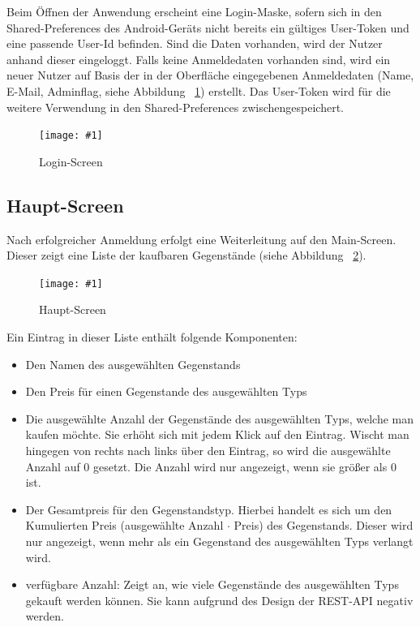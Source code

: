 \documentclass{scrartcl}
\newcommand{\cfigure}[3]{%
\begin{figure}[ht]
	\centering
	\texttt{[image: \#1]}
	\caption{#2}{#3} %
\end{figure}
}
\begin{document}
	Beim Öffnen der Anwendung erscheint eine Login-Maske, sofern sich in den Shared-Preferences des Android-Geräts nicht bereits ein gültiges User-Token und eine passende User-Id befinden.
	Sind die Daten vorhanden, wird der Nutzer anhand dieser eingeloggt.
	Falls keine Anmeldedaten vorhanden sind, wird ein neuer Nutzer auf Basis der in der Oberfläche eingegebenen Anmeldedaten (Name, E-Mail, Adminflag, siehe Abbildung ~\ref{loginscreen}) erstellt.
	Das User-Token wird für die weitere Verwendung in den Shared-Preferences zwischengespeichert.

	\cfigure{figures/placeholder.png}{Login-Screen}{\label{loginscreen}}

	\subsection{Haupt-Screen}\label{subsec:haupt-screen}

	Nach erfolgreicher Anmeldung erfolgt eine Weiterleitung auf den Main-Screen.
	Dieser zeigt eine Liste der kaufbaren Gegenstände (siehe Abbildung ~\ref{mainscreen}).

	\cfigure{figures/placeholder.png}{Haupt-Screen}{\label{mainscreen}}

	Ein Eintrag in dieser Liste enthält folgende Komponenten:

	\begin{itemize}
		\item Den Namen des ausgewählten Gegenstands

		\item Den Preis für einen Gegenstande des ausgewählten Typs

		\item Die ausgewählte Anzahl der Gegenstände des ausgewählten Typs, welche man kaufen möchte.
		Sie erhöht sich mit jedem Klick auf den Eintrag.
		Wischt man hingegen von rechts nach links über den Eintrag, so wird die ausgewählte Anzahl auf 0 gesetzt.
		Die Anzahl wird nur angezeigt, wenn sie größer als 0 ist.

		\item Der Gesamtpreis für den Gegenstandstyp.
		Hierbei handelt es sich um den Kumulierten Preis (ausgewählte Anzahl $\cdot$ Preis) des Gegenstands.
		Dieser wird nur angezeigt, wenn mehr als ein Gegenstand des ausgewählten Typs verlangt wird.

		\item verfügbare Anzahl: Zeigt an, wie viele Gegenstände des ausgewählten Typs gekauft werden können.
		Sie kann aufgrund des Design der REST-API negativ werden.
	\end{itemize}
\end{document}
